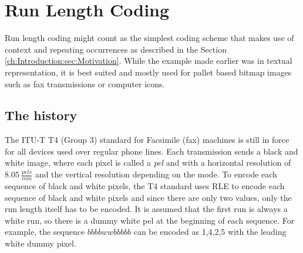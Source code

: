 \section{Run Length Coding}
\label{ch:Principles of compression:sec:Run Length Encoding}
\par{
	Run length coding might count as the simplest coding scheme that makes use of context and repeating occurrences as described in the Section \ref{ch:Introduction:sec:Motivation}. While the example made earlier was in textual representation, it is best suited and mostly used for pallet based bitmap images \cite{palette-image} such as fax transmissions or computer icons.
}

\subsection{The history}
\label{ch:Principles of compression:sec:Run Length Encoding:subSec:History}
\par{
 The ITU-T T4 (Group 3) standard for Facsimile (fax) machines \cite{ITU} is still in force for all devices used over regular phone lines. Each transmission sends a black and white image, where each pixel is called a \textit{pel} and with a horizontal resolution of $8.05 \: \frac{pels}{mm}$ and the vertical resolution depending on the mode. To encode each sequence of black and white pixels, the T4 standard uses RLE to encode each sequence of black and white pixels and since there are only two values, only the run length itself has to be encoded. It is assumed that the first run is always a white run, so there is a dummy white pel at the beginning of each sequence. For example, the sequence $bbbbwwbbbbb$ can be encoded as 1,4,2,5 with the leading white dummy pixel.
}
	
